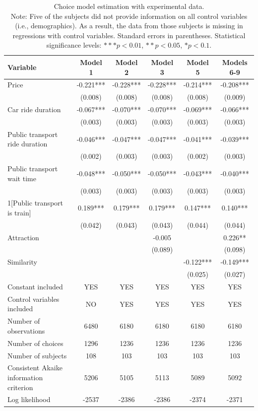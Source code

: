 \documentclass[a4paper,12pt]{article}
\begin{document}
\clearpage
\begin{table}
    \centering
    \begin{tabular}{p{7cm}ccccc}
    \toprule
    Variable & Model 1 & Model 2 & Model 3 & Model 5 & Models 6-9 \\
    \midrule
    Price & -0.221*** & -0.228*** & -0.228*** & -0.214*** & -0.208*** \\
    & (0.008) & (0.008) & (0.008) & (0.008) & (0.009) \\
    Car ride duration & -0.067*** & -0.070*** & -0.070*** & -0.069*** & -0.066*** \\
    & (0.003) & (0.003) & (0.003) & (0.003) & (0.003) \\
    Public transport ride duration & -0.046*** & -0.047*** & -0.047*** & -0.041*** & -0.039*** \\
    & (0.002) & (0.003) & (0.003) & (0.002) & (0.003) \\
    Public transport wait time & -0.048*** & -0.050*** & -0.050*** & -0.043*** & -0.040*** \\
    & (0.003) & (0.003) & (0.003) & (0.003) & (0.003) \\
    1[Public transport is train] & 0.189*** & 0.179*** & 0.179*** & 0.147*** & 0.140*** \\
    & (0.042) & (0.043) & (0.043) & (0.044) & (0.044) \\
    Attraction & & & -0.005 & & 0.226** \\
    & & & (0.089) & & (0.098) \\
    Similarity & & & & -0.122*** & -0.149*** \\
    & & & & (0.025) & (0.027) \\
    Constant included & YES & YES & YES & YES & YES \\
    Control variables included & NO & YES & YES & YES & YES \\
    Number of observations & 6480 & 6180 & 6180 & 6180 & 6180 \\
    Number of choices & 1296 & 1236 & 1236 & 1236 & 1236 \\
    Number of subjects & 108 & 103 & 103 & 103 & 103 \\
    Consistent Akaike information criterion & 5206 & 5105 & 5113 & 5089 & 5092 \\
    Log likelihood & -2537 & -2386 & -2386 & -2374 & -2371 \\
    \bottomrule
    \end{tabular}
    \caption[Choice model results for experimental data]{Choice model estimation with experimental data. \\
    Note: Five of the subjects did not provide information on all control variables (i.e., demographics). As a result, the data from those subjects is missing in regressions with control variables. Standard errors in parentheses. Statistical significance levels: $*** p<0.01$, $** p<0.05$, $* p<0.1$.}
    \label{tab:nejcModelResults}
\end{table}
\end{document}
